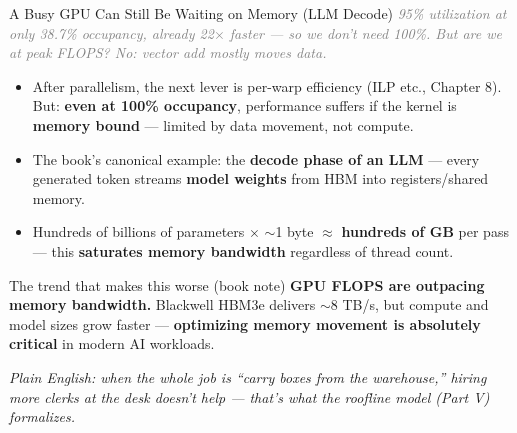 \documentclass[aspectratio=169]{beamer}
\newcommand{\kw}[1]{\textbf{\textcolor{kwblue}{#1}}}
\newcommand{\pe}[1]{\par{\setlength{\fboxsep}{2.5pt}\noindent\colorbox{navy!9}{\parbox{\dimexpr\textwidth-5pt\relax}{\footnotesize\itshape Plain English: #1}}}}
\newcommand{\bridge}[1]{{\footnotesize\itshape\textcolor{gray}{#1}}\par}
\begin{document}
\begin{frame}{A Busy GPU Can Still Be Waiting on Memory (LLM Decode)}
  \bridge{95\% utilization at only 38.7\% occupancy, already 22$\times$ faster --- so we don't need 100\%. But are we at peak FLOPS? No: vector add mostly \emph{moves data}.}
  \vspace{-4pt}
  \begin{itemize}\small
    \item After parallelism, the next lever is per-warp efficiency (ILP etc., Chapter 8). But:
          \kw{even at 100\% occupancy}, performance suffers if the kernel is
          \kw{memory bound} --- limited by data movement, not compute.
    \item The book's canonical example: the \kw{decode phase of an LLM} ---
          every generated token streams \kw{model weights} from HBM into registers/shared memory.
    \item Hundreds of billions of parameters $\times$ $\sim$1 byte $\approx$
          \kw{hundreds of GB} per pass --- this \kw{saturates memory bandwidth} regardless
          of thread count.
  \end{itemize}
  \begin{block}{The trend that makes this worse (book note)}
    \kw{GPU FLOPS are outpacing memory bandwidth.} Blackwell HBM3e delivers $\sim$8 TB/s,
    but compute and model sizes grow faster --- \kw{optimizing memory movement is absolutely
    critical} in modern AI workloads.
  \end{block}
  \pe{when the whole job is ``carry boxes from the warehouse,'' hiring more clerks at the desk doesn't help --- that's what the roofline model (Part V) formalizes.}
\end{frame}
\end{document}
